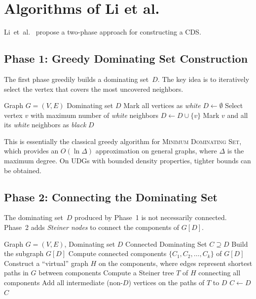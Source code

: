 \documentclass[11pt,a4paper]{article}
\begin{document}
\section{Algorithms of Li et al.}\label{sec:algorithms}

Li~et~al.~\cite{li2005} propose a two-phase approach for constructing a CDS.

\subsection{Phase 1: Greedy Dominating Set Construction}

The first phase greedily builds a dominating set~$D$.  The key idea is to
iteratively select the vertex that covers the most uncovered neighbors.

\begin{algorithm}[H]
\caption{Phase 1 - Greedy Dominating Set}\label{alg:phase1}
\begin{algorithmic}[1]
\REQUIRE Graph $G = (V, E)$
\ENSURE Dominating set $D$
\STATE Mark all vertices as \textit{white}
\STATE $D \leftarrow \emptyset$
  \STATE Select vertex $v$ with maximum number of \textit{white} neighbors
  \STATE $D \leftarrow D \cup \{v\}$
  \STATE Mark $v$ and all its \textit{white} neighbors as \textit{black}
\ENDWHILE
\RETURN $D$
\end{algorithmic}
\end{algorithm}

This is essentially the classical greedy algorithm for \textsc{Minimum
Dominating Set}, which provides an $O(\ln \Delta)$ approximation on general
graphs, where $\Delta$ is the maximum degree.  On UDGs with bounded density
properties, tighter bounds can be obtained.

\subsection{Phase 2: Connecting the Dominating Set}

The dominating set~$D$ produced by Phase~1 is not necessarily connected.  Phase~2
adds \emph{Steiner nodes} to connect the components of $G[D]$.

\begin{algorithm}[H]
\caption{Phase 2 - Connecting via Steiner Nodes}\label{alg:phase2}
\begin{algorithmic}[1]
\REQUIRE Graph $G = (V, E)$, Dominating set $D$
\ENSURE Connected Dominating Set $C \supseteq D$
\STATE Build the subgraph $G[D]$
\STATE Compute connected components $\{C_1, C_2, \ldots, C_k\}$ of $G[D]$
\STATE Construct a ``virtual'' graph $H$ on the components, where edges
       represent shortest paths in $G$ between components
\STATE Compute a Steiner tree $T$ of $H$ connecting all components
\STATE Add all intermediate (non-$D$) vertices on the paths of $T$ to $D$
\STATE $C \leftarrow D$
\RETURN $C$
\end{algorithmic}
\end{algorithm}
\end{document}
